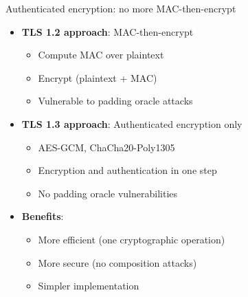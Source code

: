 \ifdefined\PRESENTATION\else\PassOptionsToClass{handout}{beamer}\fi\documentclass[aspectratio=169, lualatex]{beamer}
\begin{document}
\begin{frame}{Authenticated encryption: no more MAC-then-encrypt}
	\begin{itemize}
		\item \textbf{TLS 1.2 approach}: MAC-then-encrypt
		      \begin{itemize}
			      \item Compute MAC over plaintext
			      \item Encrypt (plaintext + MAC)
			      \item Vulnerable to padding oracle attacks
		      \end{itemize}
		\item \textbf{TLS 1.3 approach}: Authenticated encryption only
		      \begin{itemize}
			      \item AES-GCM, ChaCha20-Poly1305
			      \item Encryption and authentication in one step
			      \item No padding oracle vulnerabilities
		      \end{itemize}
		\item \textbf{Benefits}:
		      \begin{itemize}
			      \item More efficient (one cryptographic operation)
			      \item More secure (no composition attacks)
			      \item Simpler implementation
		      \end{itemize}
	\end{itemize}
\end{frame}
\end{document}
